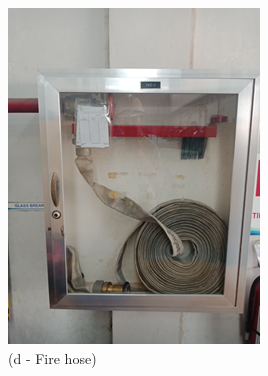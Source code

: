 \begin{figure}[h]
\begin{minipage}[b]{0.22\linewidth}
	\includegraphics[width=\textwidth]{figures/ch04_fig_safety06}
	\caption*{(d - Fire hose)}
\end{minipage}
	\hspace{0.03cm}
\begin{minipage}[b]{0.22\linewidth}
	\centering

\end{minipage}
\end{figure}
